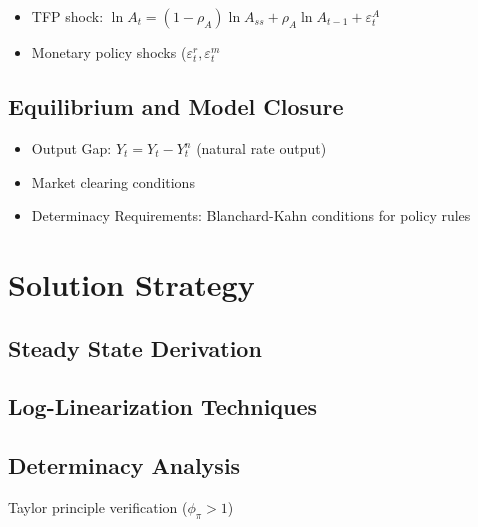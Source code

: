 \documentclass[11pt,preprint]{elsarticle}
\numberwithin{equation}{section}
\numberwithin{figure}{section}
\numberwithin{table}{section}
\begin{document}
\begin{itemize}
\item
  TFP shock:
  \(\ln A_t = (1-\rho_A)\ln A_{ss} + \rho_A \ln A_{t-1} + \varepsilon_t^A\)
\item
  Monetary policy shocks (\(\varepsilon_t^r, \varepsilon_t^m\)
\end{itemize}

\subsection{Equilibrium and Model
Closure}\label{equilibrium-and-model-closure}

\begin{itemize}
\item
  Output Gap: \(\hat{Y}_t = Y_t - Y_t^n\) (natural rate output)
\item
  Market clearing conditions
\item
  Determinacy Requirements: Blanchard-Kahn conditions for policy rules
\end{itemize}

\section{Solution Strategy}\label{solution-strategy}

\subsection{Steady State Derivation}\label{steady-state-derivation}

\subsection{Log-Linearization
Techniques}\label{log-linearization-techniques}

\subsection{Determinacy Analysis}\label{determinacy-analysis}

Taylor principle verification (\(\phi_\pi > 1\))
\end{document}
